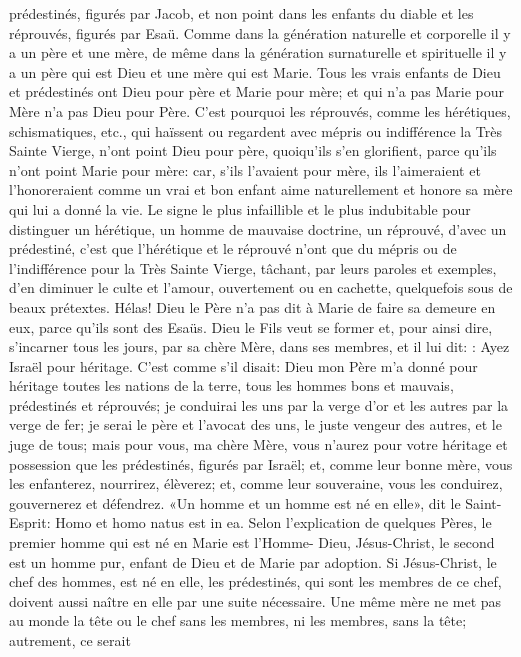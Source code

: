 prédestinés, figurés par Jacob, et non point dans les enfants du diable et les réprouvés, figurés par Esaü.
 Comme dans la génération naturelle et corporelle il y a un père et une mère, de même dans la génération
surnaturelle et spirituelle il y a un père qui est Dieu et une mère qui est Marie. Tous les vrais enfants de Dieu et
prédestinés ont Dieu pour père et Marie pour mère; et qui n'a pas Marie pour Mère n'a pas Dieu pour Père. C'est
pourquoi les réprouvés, comme les hérétiques, schismatiques, etc., qui haïssent ou regardent avec mépris ou
indifférence la Très Sainte Vierge, n'ont point Dieu pour père, quoiqu'ils s'en glorifient, parce qu'ils n'ont point Marie
pour mère: car, s'ils l'avaient pour mère, ils l'aimeraient et l'honoreraient comme un vrai et bon enfant aime
naturellement et honore sa mère qui lui a donné la vie.
Le signe le plus infaillible et le plus indubitable pour distinguer un hérétique, un homme de mauvaise doctrine, un
réprouvé, d'avec un prédestiné, c'est que l'hérétique et le réprouvé n'ont que du mépris ou de l'indifférence pour la
Très Sainte Vierge, tâchant, par leurs paroles et exemples, d'en diminuer le culte et l'amour, ouvertement ou en
cachette, quelquefois sous de beaux prétextes. Hélas! Dieu le Père n'a pas dit à Marie de faire sa demeure en
eux, parce qu'ils sont des Esaüs.
 Dieu le Fils veut se former et, pour ainsi dire, s'incarner tous les jours, par sa chère Mère, dans ses membres,
et il lui dit: : Ayez Israël pour héritage. C'est comme s'il disait: Dieu mon Père m'a donné pour
héritage toutes les nations de la terre, tous les hommes bons et mauvais, prédestinés et réprouvés; je conduirai les
uns par la verge d'or et les autres par la verge de fer; je serai le père et l'avocat des uns, le juste vengeur des
autres, et le juge de tous; mais pour vous, ma chère Mère, vous n'aurez pour votre héritage et possession que les
prédestinés, figurés par Israël; et, comme leur bonne mère, vous les enfanterez, nourrirez, élèverez; et, comme
leur souveraine, vous les conduirez, gouvernerez et défendrez.
 «Un homme et un homme est né en elle», dit le Saint-Esprit: Homo et homo natus est in ea. Selon l'explication
de quelques Pères, le premier homme qui est né en Marie est l'Homme- Dieu, Jésus-Christ, le second est un
homme pur, enfant de Dieu et de Marie par adoption. Si Jésus-Christ, le chef des hommes, est né en elle, les
prédestinés, qui sont les membres de ce chef, doivent aussi naître en elle par une suite nécessaire. Une même
mère ne met pas au monde la tête ou le chef sans les membres, ni les membres, sans la tête; autrement, ce serait
